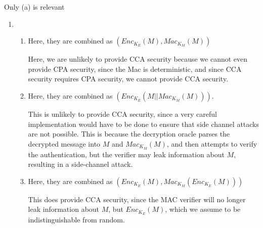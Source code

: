 


Only (a) is relevant
\begin{enumerate}[label=(\alph*)]

  \item
    \begin{enumerate}[label=(\roman*)]
      \item

        Here, they are combined as $(Enc_{K_E}(M), Mac_{K_M}(M))$

        Here, we are unlikely to provide CCA security because we cannot even provide CPA security, since the Mac is deterministic, and since CCA security requires CPA security, we cannot provide CCA security.

      \item
        Here, they are combined as $(Enc_{K_E}(M || Mac_{K_M}(M)))$.

        This is unlikely to provide CCA security, since a very careful implementation would have to be done to ensure that side channel attacks are not possible. This is because the decryption oracle parses the decrypted message into $M$ and $Mac_{K_M}(M)$, and then attempts to verify the authentication, but the verifier may leak information about $M$, resulting in a side-channel attack.

      \item
        Here, they are combined as $(Enc_{K_E}(M), Mac_{K_M}(Enc_{K_E}(M)))$

        This does provide CCA security, since the MAC verifier will no longer leak information about $M$, but $Enc_{K_E}(M)$, which we assume to be indistinguishable from random.
        
    \end{enumerate}
        
    \end{enumerate}

